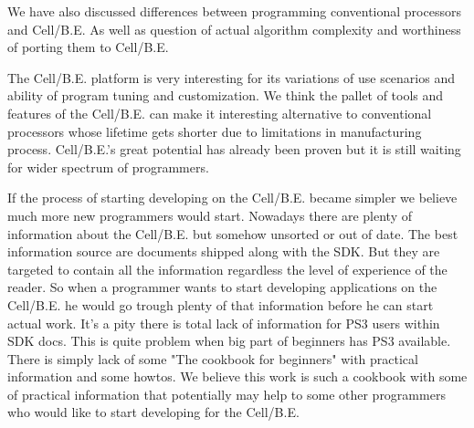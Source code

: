 \par
We have also discussed differences between programming conventional processors and Cell/B.E.
As well as question of actual algorithm complexity and worthiness of porting them to Cell/B.E.

\par
The Cell/B.E. platform is very interesting for its variations of use scenarios and ability of program tuning and customization.
We think the pallet of tools and features of the Cell/B.E. can make it interesting alternative to conventional processors whose lifetime gets shorter due to limitations in manufacturing process.
Cell/B.E.'s great potential has already been proven but it is still waiting for wider spectrum of programmers.

\par
If the process of starting developing on the Cell/B.E. became simpler we believe much more new programmers would start.
Nowadays there are plenty of information about the Cell/B.E. but somehow unsorted or out of date.
The best information source are documents shipped along with the SDK.
But they are targeted to contain all the information regardless the level of experience of the reader.
So when a programmer wants to start developing applications on the Cell/B.E. he would go trough plenty of that information before he can start actual work.
It's a pity there is total lack of information for PS3 users within SDK docs.
This is quite problem when big part of beginners has PS3 available.
There is simply lack of some "The cookbook for beginners" with practical information and some howtos.
We believe this work is such a cookbook with some of practical information that potentially may help to some other programmers who would like to start developing for the Cell/B.E.
